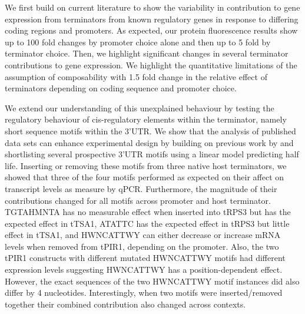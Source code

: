 \documentclass[../main.tex]{subfiles}
\begin{document}
We first build on current literature to show the variability in contribution to gene expression from terminators from known regulatory genes in response to differing coding regions and promoters. 
As expected, our protein fluorescence results show up to 100 fold changes by promoter choice alone and then up to 5 fold by terminator choice.
Then, we highlight significant changes in several terminator contributions to gene expression. 
We highlight the quantitative limitations of the assumption of composability with 1.5 fold change in the relative effect of terminators depending on coding sequence and promoter choice.


We extend our understanding of this unexplained behaviour by testing the regulatory behaviour of cis-regulatory elements within the terminator, namely short sequence motifs within the 3'UTR.
We show that the analysis of published data sets can enhance experimental design by building on previous work by \cite{Cheng2017} and shortlisting several prospective 3'UTR motifs using a linear model predicting half life.
Inserting or removing these motifs from three native host terminators, we showed that three of the four motifs performed as expected on their affect on transcript levels as measure by qPCR.
Furthermore, the magnitude of their contributions changed for all motifs across promoter and host terminator. 
TGTAHMNTA has no measurable effect when inserted into tRPS3 but has the expected effect in tTSA1, ATATTC has the expected effect in tRPS3 but little effect in tTSA1, and HWNCATTWY can either decrease or increase mRNA levels when removed from tPIR1, depending on the promoter.
Also, the two tPIR1 constructs with different mutated HWNCATTWY motifs had different expression levels suggesting HWNCATTWY has a position-dependent effect. 
However, the exact sequences of the two HWNCATTWY motif instances did also differ by 4 nucleotides.
Interestingly, when two motifs were inserted/removed together their combined contribution also changed across contexts.
\end{document}

